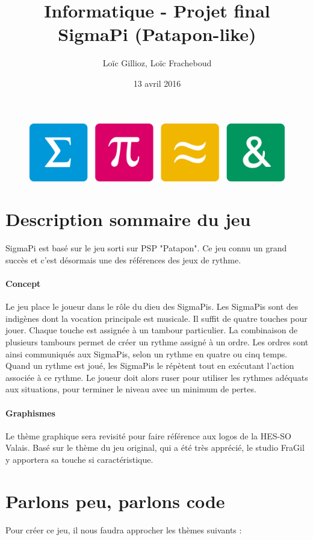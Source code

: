 \documentclass[a4paper,10pt]{article}
\author{Loïc Gillioz, Loïc Fracheboud}
\title{Informatique - Projet final \\ \Huge SigmaPi (Patapon-like)}
\date{13 avril 2016}
\begin{document}
 \maketitle
 \begin{figure}[!h]
 \centering
 \includegraphics[scale=0.15]{images/icones}
 \end{figure}
 \pagebreak
 
 \section{Description sommaire du jeu}
  SigmaPi est basé sur le jeu sorti sur PSP "Patapon". Ce jeu connu un grand succès et c'est désormais une des références des jeux de rythme.
  \paragraph*{Concept}
  Le jeu place le joueur dans le rôle du dieu des SigmaPis. Les SigmaPis sont des indigènes dont la vocation principale est musicale.
Il suffit de quatre touches pour jouer. Chaque touche est assignée à un tambour particulier. La combinaison de plusieurs tambours permet de créer un rythme assigné à un ordre. Les ordres sont ainsi communiqués aux SigmaPis, selon un rythme en quatre ou cinq temps. Quand un rythme est joué, les SigmaPis le répètent tout en exécutant l'action associée à ce rythme. Le joueur doit alors ruser pour utiliser les rythmes adéquats aux situations, pour terminer le niveau avec un minimum de pertes.
  \paragraph*{Graphismes}
Le thème graphique sera revisité pour faire référence aux logos de la \mbox{HES-SO} Valais. Basé sur le thème du jeu original, qui a été très apprécié, le studio FraGil y apportera sa touche si caractéristique.
  \section{Parlons peu, parlons code}
  Pour créer ce jeu, il nous faudra approcher les thèmes suivants :
\end{document}
